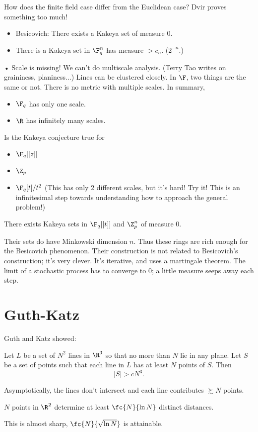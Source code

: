 How does the finite field case differ from the Euclidean case? Dvir proves something too much!
\begin{itemize}
\item
Besicovich: There exists a Kakeya set of measure 0.
\item
There is a Kakeya set in $\F_q^n$ has measure $>c_n$. ($2^{-n}$.)
\end{itemize}•
Scale is missing! We can't do multiscale analysis. (Terry Tao writes on graininess, planiness...) Lines can be clustered closely. In $\F$, two things are the same or not. There is no metric with multiple scales. In summary,
\begin{itemize}
\item
$\F_q$ has only one scale.
\item
$\R$ has infinitely many scales.
\end{itemize}
\begin{prb}
Is the Kakeya conjecture true for
\begin{itemize}
\item
$\F_q[[z]]$
\item
$\Z_p$
\item 
$\F_q[t]/t^2$
(This has only 2 different scales, but it's hard! Try it! This is an infinitesimal step towards understanding how to approach the general problem!)
\end{itemize}
\end{prb}
\begin{thm}
There exists Kakeya sets in $\F_q[[t]]$ and $\Z_p^n$ of measure 0.
\end{thm}
Their sets do have Minkowski dimension $n$. Thus these rings are rich enough for the Besicovich phenomenon. Their construction is not related to Besicovich's construction; it's very clever. It's iterative, and uses a martingale theorem. The limit of a stochastic process has to converge to 0; a little measure seeps away each step.

\section{Guth-Katz}

Guth and Katz showed:
\begin{thm}
Let $L$ be a set of $N^2$ lines in $\R^3$ so that no more than $N$ lie in any plane. Let $S$ be a set of points such that each line in $L$ has at least $N$ points of $S$. Then 
\[
|S|>cN^3.
\]
\end{thm}
Asymptotically, the lines don't intersect and each line contributes $\succsim N$ points.
\begin{thm}
$N$ points in $\R^2$ determine at least $\fc{N}{\ln N}$ distinct distances.
\end{thm}
This is almost sharp, $\fc{N}{\sqrt{\ln N}}$ is attainable. %

